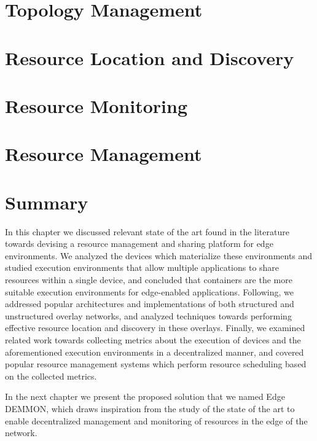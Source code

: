 \section{Topology Management} \label{sec:topology_management} 

\section{Resource Location and Discovery} \label{sec:res_location} 

\section{Resource Monitoring} \label{sec:res_monitoring} 

\section{Resource Management} \label{sec:res_management} 

\section{Summary}

In this chapter we discussed relevant state of the art found in the literature towards devising a resource management and sharing platform for edge environments. We analyzed the devices which materialize these environments and studied execution environments that allow multiple applications to share resources within a single device, and concluded that containers are the more suitable execution environments for edge-enabled applications. Following, we addressed popular architectures and implementations of both structured and unstructured overlay networks, and analyzed techniques towards performing effective resource location and discovery in these overlays. Finally, we examined related work towards collecting metrics about the execution of devices and the aforementioned execution environments in a decentralized manner, and covered popular resource management systems which perform resource scheduling based on the collected metrics.

In the next chapter we present the proposed solution that we named Edge DEMMON, which draws inspiration from the study of the state of the art to enable decentralized management and monitoring of resources in the edge of the network.